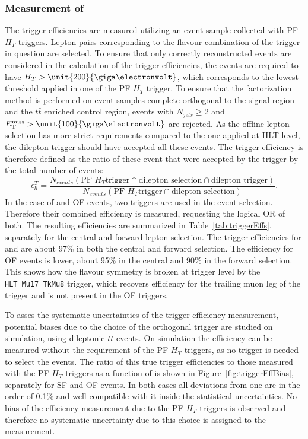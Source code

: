 \subsubsection{Measurement of \RT}
\label{sec:triggerEffs}
The trigger efficiencies are measured utilizing an event sample collected with PF $H_T$ triggers. Lepton pairs corresponding to the flavour combination of the trigger in question are selected. To ensure that only correctly reconstructed events are considered in the calculation of the trigger efficiencies, the events are required to have $H_T > \unit{200}{\giga\electronvolt}$, which corresponds to the lowest threshold applied in one of the PF $H_T$ trigger. To ensure that the factorization method is performed on event samples complete orthogonal to the signal region and the $t\bar{t}$ enriched control region, events with $N_{jets} \geq 2$ and $\MET > \unit{100}{\giga\electronvolt}$ are rejected. As the offline lepton selection has more strict requirements compared to the one applied at HLT level, the dilepton trigger should have accepted all these events. The trigger efficiency is therefore defined as the ratio of these event that were accepted by the trigger by the total number of events:
\begin{equation}
\epsilon_{ll}^T = \frac{N_{events}(\text{PF }H_T\text{trigger} \cap \text{dilepton selection} \cap \text{dilepton trigger})}{N_{events}(\text{PF }H_T\text{trigger} \cap \text{dilepton selection})}.
\end{equation}
In the case of \MM and OF events, two triggers are used in the event selection. Therefore their combined efficiency is measured, requesting the logical OR of both. The resulting efficiencies are summarized in Table~\ref{tab:triggerEffs}, separately for the central and forward lepton selection. The trigger efficiencies for \EE and \MM are about 97\% in both the central and forward selection. The efficiency for OF events is lower, about 95\% in the central and 90\% in the forward selection. This shows how the flavour symmetry is broken at trigger level by the \verb+HLT_Mu17_TkMu8+ trigger, which recovers efficiency for the trailing muon leg of the trigger and is not present in the OF triggers.   

To asses the systematic uncertainties of the trigger efficiency measurement, potential biases due to the choice of the orthogonal trigger  are studied on simulation, using dileptonic $t\bar{t}$ events. On simulation the efficiency can be measured without the requirement of the PF $H_T$ triggers, as no trigger is needed to select the events. The ratio of this true trigger efficiencies to those measured with the PF $H_T$ triggers as a function of \mll is shown in Figure~\ref{fig:triggerEffBias}, separately for SF and OF events. In both cases all deviations from one are in the order of 0.1\% and well compatible with it inside the statistical uncertainties. No bias of the efficiency measurement due to the PF $H_T$ triggers is observed and therefore no systematic uncertainty due to this choice is assigned to the measurement.
